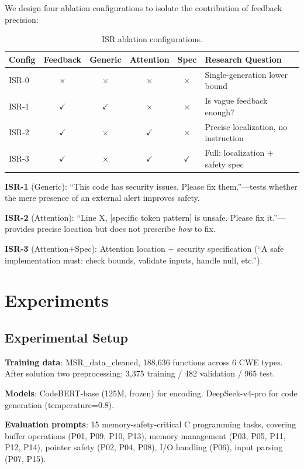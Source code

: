 \documentclass[sigconf,10pt]{acmart}
\begin{document}
We design four ablation configurations to isolate the contribution of feedback precision:

\begin{table}[h]
\centering
\caption{ISR ablation configurations.}
\begin{tabular}{lccccp{3.5cm}}
\toprule
Config & Feedback & Generic & Attention & Spec & Research Question \\
\midrule
ISR-0 & $\times$ & $\times$ & $\times$ & $\times$ & Single-generation lower bound \\
ISR-1 & $\checkmark$ & $\checkmark$ & $\times$ & $\times$ & Is vague feedback enough? \\
ISR-2 & $\checkmark$ & $\times$ & $\checkmark$ & $\times$ & Precise localization, no instruction \\
ISR-3 & $\checkmark$ & $\times$ & $\checkmark$ & $\checkmark$ & Full: localization + safety spec \\
\bottomrule
\end{tabular}
\end{table}

\textbf{ISR-1} (Generic): ``This code has security issues. Please fix them.''---tests whether the mere presence of an external alert improves safety.

\textbf{ISR-2} (Attention): ``Line X, [specific token pattern] is unsafe. Please fix it.''---provides precise location but does not prescribe \textit{how} to fix.

\textbf{ISR-3} (Attention+Spec): Attention location + security specification (``A safe implementation must: check bounds, validate inputs, handle null, etc.'').

\section{Experiments}

\subsection{Experimental Setup}

\textbf{Training data}: MSR\_data\_cleaned, 188,636 functions across 6 CWE types. After solution two preprocessing: 3,375 training / 482 validation / 965 test.

\textbf{Models}: CodeBERT-base (125M, frozen) for encoding. DeepSeek-v4-pro for code generation (temperature=0.8).

\textbf{Evaluation prompts}: 15 memory-safety-critical C programming tasks, covering buffer operations (P01, P09, P10, P13), memory management (P03, P05, P11, P12, P14), pointer safety (P02, P04, P08), I/O handling (P06), input parsing (P07, P15).
\end{document}
